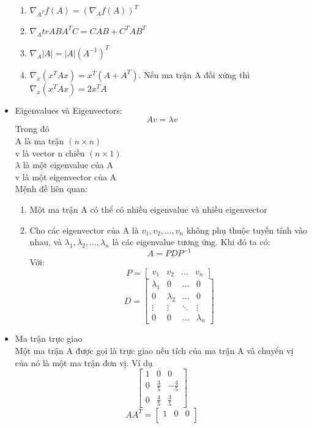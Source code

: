 \begin{itemize}
\begin{enumerate}
    \item $\nabla_{A^T} f(A) = (\nabla_A f(A))^T$
    \item $\nabla_A trABA^TC = CAB + C^TAB^T$
    \item $\nabla_A |A|=|A|(A^{-1})^T$
    \item $\nabla_x (x^TAx) = x^T(A + A^T)$. Nếu ma trận A đối xứng thì
    $\nabla_x (x^TAx) = 2x^TA$
  \end{enumerate}
  \item Eigenvalues và Eigenvectors:
  \[ Av=\lambda v \]
  Trong đó\\
  \tab A là ma trận $(n\times n)$\\
  \tab v là vector n chiều $(n\times 1)$\\
  \tab $\lambda$ là một eigenvalue của A\\
  \tab v là một eigenvector của A\\
  Mệnh đề liên quan:
  \begin{enumerate}
    \item Một ma trận A có thể có nhiều eigenvalue và nhiều eigenvector
    \item Cho các eigenvector của A là $v_1,v_2,\dots,v_n$ không phụ thuộc tuyến
    tính vào nhau, và $\lambda_1,\lambda_2,\dots,\lambda_n$ là các eigenvalue
    tương ứng. Khi đó ta có:
    \[ A = PDP^{-1} \]
    Với:
    \[ P = \begin{bmatrix} v_1 & v_2 & \dots & v_n \end{bmatrix} \]
    \[ D = 
    \begin{bmatrix} 
    \lambda_1 & 0 & \dots & 0 \\
    0 & \lambda_2 & \dots & 0 \\
    \vdots & \vdots & \ddots & \vdots \\
    0 & 0 & \dots & \lambda_n 
    \end{bmatrix} \]
  \end{enumerate}
  \item Ma trận trực giao\\
  Một ma trận A được gọi là trực giao nếu tích của ma trận A và chuyển vị của nó
  là một ma trận đơn vị. Ví dụ
  \[ \begin{bmatrix} 
    1 & 0 & 0 \\
    0 & \frac{3}{5} & -\frac{4}{5} \\
    0 & \frac{4}{5} & \frac{3}{5}
    \end{bmatrix} \]
  \[ AA^T = 
  \begin{bmatrix} 
    1 & 0 & 0 \\

\end{bmatrix}\]
\end{itemize}
